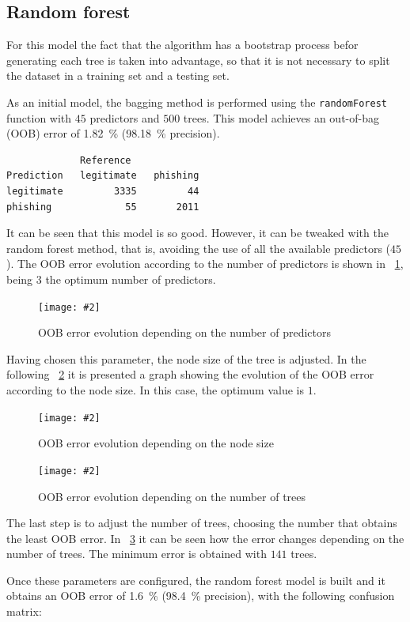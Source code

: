 \documentclass[12pt, a4paper]{article}
\newcommand*{\figref}[1]{\figurename~\ref{fig:#1}}
\newcommand{\figcaption}[4][H]{
  \begin{figure}[#1]
    \centering
    \texttt{[image: \#2]}
    \caption{#3}
    \label{fig:#2}
  \end{figure}
}
\begin{document}
    \subsection{Random forest}

    For this model the fact that the algorithm has a bootstrap process befor generating each tree is taken into advantage, so that it is not necessary to split the dataset in a training set and a testing set.

      As an initial model, the bagging method is performed using the \texttt{randomForest} function with $45$ predictors and $500$ trees. This model achieves an out-of-bag (OOB) error of \SI{1.82}{\percent} (\SI{98.18}{\percent} precision).

      \begin{verbatim}
             Reference
Prediction   legitimate   phishing
legitimate         3335         44
phishing             55       2011
      \end{verbatim}

      It can be seen that this model is so good. However, it can be tweaked with the random forest method, that is, avoiding the use of all the available predictors ($45$). The OOB error evolution according to the number of predictors is shown in \figref{mtry.png}, being $3$ the optimum number of predictors.

      \figcaption{mtry.png}{OOB error evolution depending on the number of predictors}{1}

      Having chosen this parameter, the node size of the tree is adjusted. In the following \figref{nodesize.png} it is presented a graph showing the evolution of the OOB error according to the node size. In this case, the optimum value is $1$.

      \figcaption{nodesize.png}{OOB error evolution depending on the node size}{1}

      \figcaption{trees.png}{OOB error evolution depending on the number of trees}{1}

      \newpage

      The last step is to adjust the number of trees, choosing the number that obtains the least OOB error. In \figref{trees.png} it can be seen how the error changes depending on the number of trees. The minimum error is obtained with $141$ trees.

      Once these parameters are configured, the random forest model is built and it obtains an OOB error of \SI{1.6}{\percent} (\SI{98.4}{\percent} precision), with the following confusion matrix:
\end{document}
